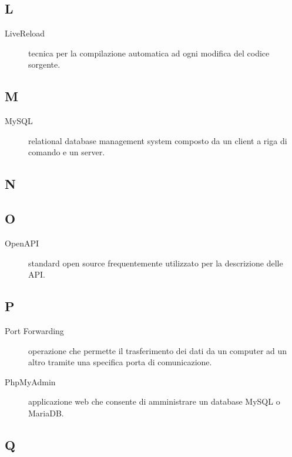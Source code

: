 \documentclass[../../../analisi-dei-requisiti.tex]{subfiles}
\begin{document}
\subsection{L}

\begin{description}
    \item[LiveReload] tecnica per la compilazione automatica ad ogni modifica del codice sorgente.
\end{description}

\subsection{M}

\begin{description}
    \item[MySQL] relational database management system composto da un client a riga di comando e un server.
\end{description}

\subsection{N}

\subsection{O}

\begin{description}
    \item[OpenAPI] standard open source frequentemente utilizzato per la descrizione delle API\@.
\end{description}

\subsection{P}

\begin{description}
    \item[Port Forwarding] operazione che permette il trasferimento dei dati da un computer ad un altro tramite una specifica porta di comunicazione.
    \item[PhpMyAdmin] applicazione web che consente di amministrare un database MySQL o MariaDB\@.
\end{description}

\subsection{Q}
\end{document}
